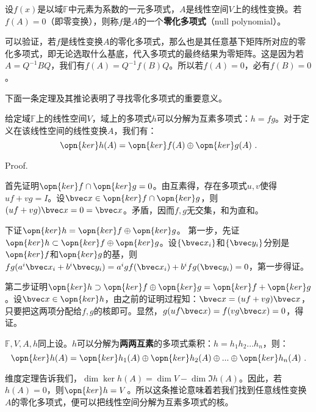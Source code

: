 


\begin{definition}{}
设$f(x)$是以域$\mathbb F$中元素为系数的一元多项式，$A$是线性空间$V$上的线性变换。若$f(A)=0$（即零变换），则称$f$是$A$的一个\textbf{零化多项式}（null polynomial）。
\end{definition}
可以验证，若$f$是线性变换$A$的零化多项式，那么也是其任意基下矩阵所对应的零化多项式，即无论选取什么基底，代入多项式的最终结果为零矩阵。这是因为若$A=Q^{-1}BQ$，我们有$f(A)=Q^{-1}f(B)Q$。所以若$f(A)=0$，必有$f(B)=0$。


下面一条定理及其推论表明了寻找零化多项式的重要意义。
\begin{theorem}{}
给定域$\mathbb F$上的线性空间$V$，域上的多项式$h$可以分解为互素多项式：$h=fg$。对于定义在该线性空间的线性变换$A$，我们有：
\begin{equation}
\opn{ker}h(A)=\opn{ker}f(A)\oplus\opn{ker}g(A)~.
\end{equation}
\end{theorem}
Proof.

首先证明$\opn{ker}f\cap \opn{ker}g=0$。由互素得，存在多项式$u,v$使得$uf+vg=I$。设$\bvec x\in \opn{ker}f\cap \opn{ker}g$，则$(uf+vg)\bvec x=0=\bvec x$。矛盾，因而$f,g$无交集，和为直和。

下证$\opn{ker}h=\opn{ker}f\oplus\opn{ker}g$。
第一步，先证$\opn{ker}h\subset\opn{ker}f\oplus\opn{ker}g$。设$\{\bvec x_i\}$和$\{\bvec y_i\}$分别是$\opn{ker}f$和$\opn{ker}g$的基，则$fg(a^i\bvec x_i+b^i \bvec y_i)=a^igf(\bvec x_i)+b^ifg(\bvec y_i)=0$，第一步得证。

第二步证明$\opn{ker}h\supset\opn{ker}f\oplus\opn{ker}g=\opn{ker}f+\opn{ker}g$。设$\bvec x\in \opn{ker}h$，由之前的证明过程知：$\bvec x=(uf+vg)\bvec x$，只要把这两项分配给$f,g$的核即可。显然，$g(uf\bvec x)=f(vg\bvec x) =0$，得证。

\begin{corollary}{}\label{cor_nullpl_1}
$\mathbb F,V,A,h$同上设。$h$可以分解为\textbf{两两互素}的多项式乘积：$h=h_1h_2...h_n$，则：
\begin{equation}
\opn{ker}h(A)=\opn{ker}h_1(A)\oplus\opn{ker}h_2(A)\oplus...\oplus\opn{ker}h_n(A)~.
\end{equation}
\end{corollary}

维度定理告诉我们，$\dim \ker h(A)=\dim V-\dim\Im h(A)$。因此，若$h(A)=0$，则$\opn{ker} h=V$。所以这条推论意味着若我们找到任意线性变换$A$的零化多项式，便可以把线性空间分解为互素多项式的核。

